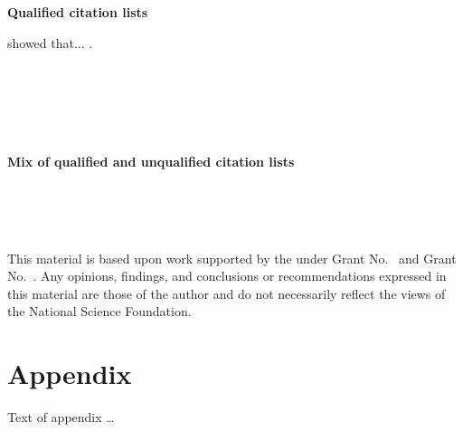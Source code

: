 \documentclass[acmsmall,review,anonymous,natbib=false]{acmart}\settopmatter{printfolios=true,printccs=false}
\begin{document}
\textbf{Qualified citation lists}

\textcites{Knuth98}{Knuth97} showed that...
\textcites(See)(){Knuth98}[cf.][]{Knuth97}. \\
\textcites(See)()[e.g.][15]{Knuth98}[cf.][10]{Knuth97} \\
\textcites(See)()[10]{Knuth98}[10]{Knuth97} \\
\textcites(See)()[10--15]{Knuth98}[cf.][10]{Knuth97} \\
\textcites(See)()[e.g.][10--15]{Knuth98}[cf.][10]{Knuth97} \\
\parencites(See)()[10--15]{Knuth98}[cf.][10]{Knuth97} \\
\parencites{knuth:texbook,Knuth97}[10--11]{Knuth98,knuth:texbook}

\textbf{Mix of qualified and unqualified citation lists}

\textcites(See)()[e.g.][]{Knuth98}[10]{JCohen96,Goossens:1999:LWC:553897} \\
\textcites[e.g.][]{Knuth98,Knuth97}[10]{Goossens:1999:LWC:553897} \\
\textcites[10]{Knuth98}{Knuth97}[cf.][]{JCohen96} \\
\textcites[15]{Knuth98}[cf.][10]{JCohen96,Goossens:1999:LWC:553897}



\begin{acks}                            %
  This material is based upon work supported by the
   under Grant
  No.~ and Grant
  No.~.  Any opinions, findings, and
  conclusions or recommendations expressed in this material are those
  of the author and do not necessarily reflect the views of the
  National Science Foundation.
\end{acks}



\nocite{*}

\printbibliography

\appendix
\section{Appendix}

Text of appendix \ldots
\end{document}
